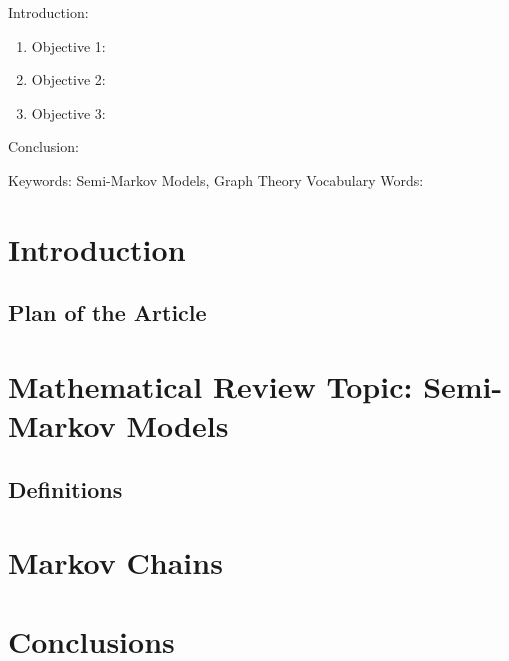 
\twocolumn
\scriptsize
\begin{frontmatter}
		\title{}
		\author{}
		\address{The Mathematical Learning Space}
\end{frontmatter}	

Introduction:
\begin{enumerate}
\item Objective 1:
\item Objective 2:
\item Objective 3:
\end{enumerate}
Conclusion:

Keywords: Semi-Markov Models, Graph Theory
Vocabulary Words:

\section{Introduction}

\subsection{Plan of the Article}


\section{Mathematical Review Topic: Semi-Markov Models}

\subsection{Definitions}


\section{Markov Chains}




\section{Conclusions}


